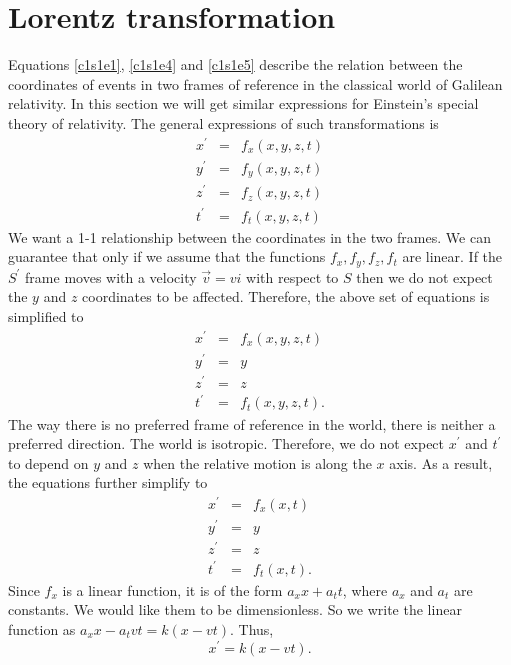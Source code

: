 \section{Lorentz transformation}\label{c1s4}
Equations \eqref{c1s1e1}, \eqref{c1s1e4} and \eqref{c1s1e5} describe the
relation between the coordinates of events in two frames of reference in the
classical world of Galilean relativity. In this section we will get similar
expressions for Einstein's special theory of relativity. The general 
expressions of such transformations is
\begin{eqnarray}
x^\prime &=& f_x(x, y, z, t) \\
y^\prime &=& f_y(x, y, z, t) \\
z^\prime &=& f_z(x, y, z, t) \\
t^\prime &=& f_t(x, y, z, t) 
\end{eqnarray}
We want a 1-1 relationship between the coordinates in the two frames. We can
guarantee that only if we assume that the functions $f_x, f_y, f_z, f_t$ are
linear. If the $S^\prime$ frame moves with a velocity $\vec{v} = v\hat{i}$ with
respect to $S$ then we do not expect the $y$ and $z$ coordinates to be affected.
Therefore, the above set of equations is simplified to
\begin{eqnarray}
x^\prime &=& f_x(x, y, z, t) \\
y^\prime &=& y \\
z^\prime &=& z \\
t^\prime &=& f_t(x, y, z, t).
\end{eqnarray}
The way there is no preferred frame of reference in the world, there is neither
a preferred direction. The world is isotropic. Therefore, we do not expect
$x^\prime$ and $t^\prime$ to depend on $y$ and $z$ when the relative motion is
along the $x$ axis. As a result, the equations further simplify to
\begin{eqnarray}
x^\prime &=& f_x(x, t) \\
y^\prime &=& y \label{c1s4e10} \\
z^\prime &=& z \label{c1s4e11} \\
t^\prime &=& f_t(x, t).
\end{eqnarray}
Since $f_x$ is a linear function, it is of the form $a_xx + a_tt$, where $a_x$
and $a_t$ are constants. We would like them to be dimensionless. So we write
the linear function as $a_xx - a_tvt = k(x - vt)$. Thus,
\begin{equation}\label{c1s4e13}
x^\prime = k(x - vt).
\end{equation}
